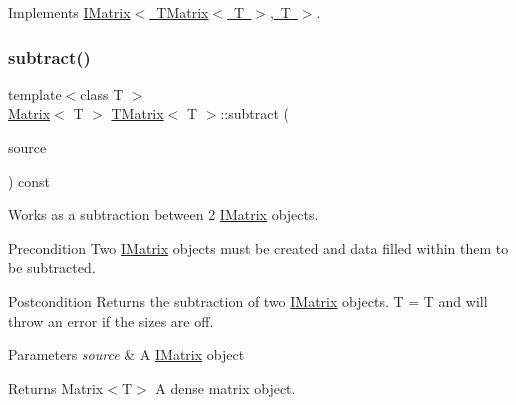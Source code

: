Implements \mbox{\hyperlink{class_i_matrix_a0bf5046efed75799656059ce2980a851}{I\+Matrix$<$ T\+Matrix$<$ T $>$, T $>$}}.

\mbox{\label{class_t_matrix_a430b0462e759a99718c2c6a64e1d143d}} 
\subsubsection{\texorpdfstring{subtract()}{subtract()}\hspace{0.1cm}{\footnotesize\ttfamily [3/6]}}
{\footnotesize\ttfamily template$<$class T $>$ \\
\mbox{\hyperlink{class_matrix}{Matrix}}$<$ T $>$ \mbox{\hyperlink{class_t_matrix}{T\+Matrix}}$<$ T $>$\+::subtract (\begin{DoxyParamCaption}\item[{const \mbox{\hyperlink{class_i_matrix}{I\+Matrix}}$<$ \mbox{\hyperlink{class_l_matrix}{L\+Matrix}}$<$ T $>$, T $>$ \&}]{source }\end{DoxyParamCaption}) const}



Works as a subtraction between 2 \mbox{\hyperlink{class_i_matrix}{I\+Matrix}} objects. 

\begin{DoxyPrecond}{Precondition}
Two \mbox{\hyperlink{class_i_matrix}{I\+Matrix}} objects must be created and data filled within them to be subtracted. 
\end{DoxyPrecond}
\begin{DoxyPostcond}{Postcondition}
Returns the subtraction of two \mbox{\hyperlink{class_i_matrix}{I\+Matrix}} objects. T = T and will throw an error if the sizes are off.
\end{DoxyPostcond}

\begin{DoxyParams}{Parameters}
{\em source} & A \mbox{\hyperlink{class_i_matrix}{I\+Matrix}} object \\
\hline
\end{DoxyParams}
\begin{DoxyReturn}{Returns}
Matrix$<$\+T$>$ A dense matrix object. 
\end{DoxyReturn}
\mbox{\label{class_t_matrix_aef4ae69df8d1cae7b023c3d07e9854d6}} 
